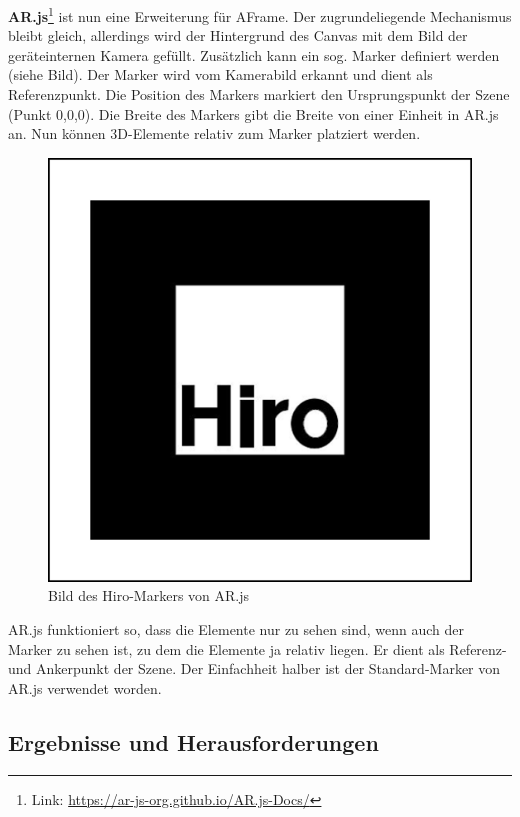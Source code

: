 \textbf{AR.js}\footnote{Link:
  \url{https://ar-js-org.github.io/AR.js-Docs/}} ist nun eine
Erweiterung für AFrame. Der zugrundeliegende Mechanismus bleibt gleich,
allerdings wird der Hintergrund des Canvas mit dem Bild der
geräteinternen Kamera gefüllt. Zusätzlich kann ein sog. Marker definiert
werden (siehe Bild). Der Marker wird vom Kamerabild erkannt und dient
als Referenzpunkt. Die Position des Markers markiert den Ursprungspunkt
der Szene (Punkt 0,0,0). Die Breite des Markers gibt die Breite von
einer Einheit in AR.js an. Nun können 3D-Elemente relativ zum Marker
platziert werden.

\begin{figure}
\centering
\includegraphics{img/hiro.png}
\caption{Bild des Hiro-Markers von AR.js}
\end{figure}

AR.js funktioniert so, dass die Elemente nur zu sehen sind, wenn auch
der Marker zu sehen ist, zu dem die Elemente ja relativ liegen. Er dient
als Referenz- und Ankerpunkt der Szene. Der Einfachheit halber ist der
Standard-Marker von AR.js verwendet worden.

\hypertarget{ergebnisse-und-herausforderungen}{%
\subsection{Ergebnisse und
Herausforderungen}\label{ergebnisse-und-herausforderungen}}

